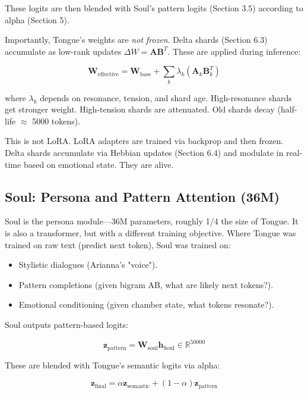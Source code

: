 \documentclass[11pt,a4paper]{article}
\begin{document}
These logits are then blended with Soul's pattern logits (Section 3.5) according to alpha (Section 5).

Importantly, Tongue's weights are \textit{not frozen}. Delta shards (Section 6.3) accumulate as low-rank updates $\Delta W = \mathbf{A} \mathbf{B}^T$. These are applied during inference:

\begin{equation}
\mathbf{W}_{\text{effective}} = \mathbf{W}_{\text{base}} + \sum_k \lambda_k (\mathbf{A}_k \mathbf{B}_k^T)
\end{equation}

where $\lambda_k$ depends on resonance, tension, and shard age. High-resonance shards get stronger weight. High-tension shards are attenuated. Old shards decay (half-life $\approx$ 5000 tokens).

This is not LoRA. LoRA adapters are trained via backprop and then frozen. Delta shards accumulate via Hebbian updates (Section 6.4) and modulate in real-time based on emotional state. They are alive.

\subsection{Soul: Persona and Pattern Attention (36M)}

Soul is the persona module—36M parameters, roughly 1/4 the size of Tongue. It is also a transformer, but with a different training objective. Where Tongue was trained on raw text (predict next token), Soul was trained on:

\begin{itemize}
\item Stylistic dialogues (Arianna's "voice").
\item Pattern completions (given bigram AB, what are likely next tokens?).
\item Emotional conditioning (given chamber state, what tokens resonate?).
\end{itemize}

Soul outputs pattern-based logits:

\begin{equation}
\mathbf{z}_{\text{pattern}} = \mathbf{W}_{\text{soul}} \mathbf{h}_{\text{Soul}} \in \mathbb{R}^{50000}
\end{equation}

These are blended with Tongue's semantic logits via alpha:

\begin{equation}
\mathbf{z}_{\text{final}} = \alpha \mathbf{z}_{\text{semantic}} + (1 - \alpha) \mathbf{z}_{\text{pattern}}
\end{equation}
\end{document}
